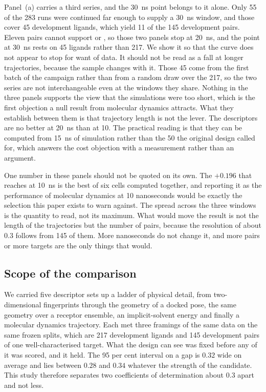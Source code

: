 Panel~(a) carries a third series, and the \SI{30}{\nano\second} point belongs to it
alone. Only 55 of the 283 runs were continued far enough to supply a
\SI{30}{\nano\second} window, and those cover 45 development ligands, which yield 11 of
the 145 development pairs. Eleven pairs cannot support \framingB{} or \framingC{}, so
those two panels stop at \SI{20}{\nano\second}, and the \framingA{} point at
\SI{30}{\nano\second} rests on 45 ligands rather than 217. We show it so that the curve
does not appear to stop for want of data. It should
not be read as a fall at longer trajectories, because the sample changes with it. Those
45 come from the first batch of the campaign rather than from a random draw over the
217, so the two series are not interchangeable even at the windows they share.
Nothing in the three panels supports the view that the simulations were too short,
which is the first objection a null result from molecular dynamics attracts. What they
establish between them is that trajectory length is not the lever. The descriptors are
no better at \SI{20}{\nano\second} than at 10. The practical reading is that they can
be computed from \SI{15}{\nano\second} of simulation rather than the 50 the original
design called for, which answers the cost objection with a measurement rather than an
argument.

One number in these panels should not be quoted on its own. The $+0.196$ that
\framingB{} reaches at \SI{10}{\nano\second} is the best of six cells computed
together, and reporting it as the performance of molecular dynamics at 10 nanoseconds
would be exactly the selection this paper exists to warn against. The spread across the
three windows is the quantity to read, not its maximum. What would move the result is
not the length of the trajectories but the number of pairs, because the resolution of
about $0.3$ follows from 145 of them. More nanoseconds do not change it, and more pairs
or more targets are the only things that would.

\subsection{Scope of the comparison}
\label{sec:synthesis}

We carried five descriptor sets up a ladder of physical detail, from two-dimensional
fingerprints through the geometry of a docked pose, the same geometry over a receptor
ensemble, an implicit-solvent energy and finally a molecular dynamics trajectory. Each
met three framings of the same data on the same frozen splits, which are 217
development ligands and 145 development pairs of one well-characterised target. What
the design can see was fixed before any of it was scored, and it held. The 95 per cent
interval on a gap is $0.32$ wide on average and lies between $0.28$ and $0.34$ whatever
the strength of the candidate. This study therefore separates two coefficients of
determination about $0.3$ apart and not less.


